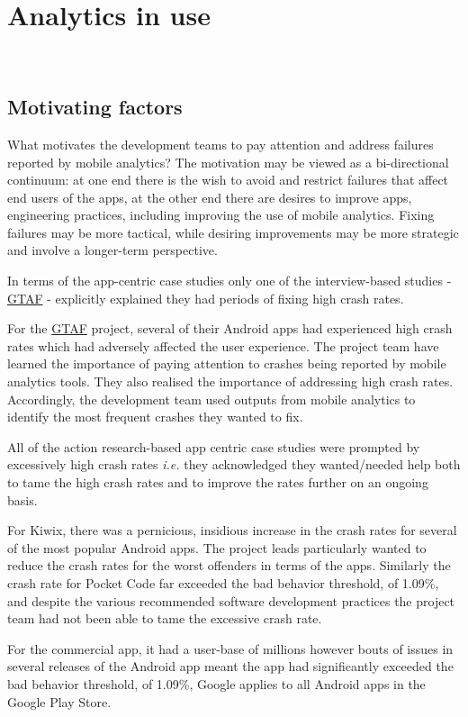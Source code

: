 \chapter{Analytics in use}~\label{chapter-analytics-in-use}


\section{Motivating factors}
What motivates the development teams to pay attention and address failures reported by mobile analytics? The motivation may be viewed as a bi-directional continuum: at one end there is the wish to avoid and restrict failures that affect end users of the apps, at the other end there are desires to improve apps, engineering practices, including improving the use of mobile analytics. Fixing failures may be more tactical, while desiring improvements may be more strategic and involve a longer-term perspective.

In terms of the app-centric case studies only one of the interview-based studies - \href{glossary-gtaf}{GTAF} - explicitly explained they had periods of fixing high crash rates.

For the \href{glossary-gtaf}{GTAF} project, several of their Android apps had experienced high crash rates which had adversely affected the user experience. The project team have learned the importance of paying attention to crashes being reported by mobile analytics tools. They also realised the importance of addressing high crash rates. Accordingly, the development team used outputs from mobile analytics to identify the most frequent crashes they wanted to fix.

All of the action research-based app centric case studies were prompted by excessively high crash rates \emph{i.e.} they acknowledged they wanted/needed help both to tame the high crash rates and to improve the rates further on an ongoing basis.

For Kiwix, there was a pernicious, insidious increase in the crash rates for several of the most popular Android apps. The project leads particularly wanted to reduce the crash rates for the worst offenders in terms of the apps. Similarly the crash rate for Pocket Code far exceeded the bad behavior threshold, of 1.09\%, and despite the various recommended software development practices the project team had not been able to tame the excessive crash rate.

For the commercial app, it had a user-base of millions however bouts of issues in several releases of the Android app meant the app had significantly exceeded the bad behavior threshold, of 1.09\%, Google applies to all Android apps in the Google Play Store.


